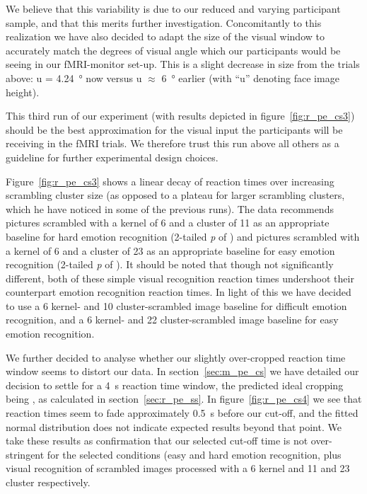 	    We believe that this variability is due to our reduced and varying participant sample, and that this merits further investigation.
	    Concomitantly to this realization we have also decided to adapt the size of the visual window to accurately match the degrees of visual angle which our participants would be seeing in our fMRI-monitor set-up. This is a slight decrease in size from the trials above: u = \SI{4.24}{\degree} now versus u $\approx$ \SI{6}{\degree} earlier (with “u” denoting face image height).
	    
	    This third run of our experiment (with results depicted in figure~\ref{fig:r_pe_cs3}) should be the best approximation for the visual input the participants will be receiving in the fMRI trials.
	    We therefore trust this run above all others as a guideline for further experimental design choices.
	    
	    Figure~\ref{fig:r_pe_cs3} shows a linear decay of reaction times over increasing scrambling cluster size
	    (as opposed to a plateau for larger scrambling clusters, which he have noticed in some of the previous runs).
	    The data recommends pictures scrambled with a kernel of \SI{6}{\pixel} and a cluster of \SI{11}{\pixel} as an appropriate baseline for hard emotion recognition
	    (2-tailed \textit{p} of )
	    and pictures scrambled with a kernel of \SI{6}{\pixel} and a cluster of \SI{23}{\pixel} as an appropriate baseline for easy emotion recognition
	    (2-tailed \textit{p} of ).
	    It should be noted that though not significantly different, both of these simple visual recognition reaction times undershoot their counterpart emotion recognition reaction times.
	    In light of this we have decided to use a \SI{6}{\pixel} kernel- and \SI{10}{\pixel} cluster-scrambled image baseline for difficult emotion recognition, 
	    and a \SI{6}{\pixel} kernel- and \SI{22}{\pixel} cluster-scrambled image baseline for easy emotion recognition.
	    
	    We further decided to analyse whether our slightly over-cropped reaction time window seems to distort our data.
	    In section~\ref{sec:m_pe_cs} we have detailed our decision to settle for a \SI{4}{\second} reaction time window, the predicted ideal cropping being , as calculated in section~\ref{sec:r_pe_ss}.
	    In figure~\ref{fig:r_pe_cs4} we see that reaction times seem to fade approximately \SI{0.5}{\second} before our cut-off, and the fitted normal distribution does not indicate expected results beyond that point.
	    We take these results as confirmation that our selected cut-off time is not over-stringent for the selected conditions (easy and hard emotion recognition, plus visual recognition of scrambled images processed with a \SI{6}{\pixel} kernel and \SI{11}{\pixel} and \SI{23}{\pixel} cluster respectively.	    
	    
